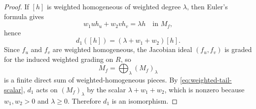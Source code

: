 \documentclass[10pt,a4paper]{amsart}
\renewcommand{\ge}{\geqslant}
\begin{document}
\begin{proof}
If $[h]$ is weighted homogeneous of weighted degree $\lambda$, then Euler's formula gives
\[
w_1uh_u+w_2vh_v=\lambda h
\quad\text{in }M_f,
\]
hence
\begin{equation}\label{eq:weighted-tail-scalar}
d_1([h])=(\lambda+w_1+w_2)[h].
\end{equation}
Since $f_u$ and $f_v$ are weighted homogeneous, the Jacobian ideal $(f_u,f_v)$ is graded for the induced weighted grading on $R$, so
\[
M_f=\bigoplus_{\lambda}(M_f)_\lambda
\]
is a finite direct sum of weighted-homogeneous pieces. By \eqref{eq:weighted-tail-scalar}, $d_1$ acts on $(M_f)_\lambda$ by the scalar \(\lambda+w_1+w_2\), which is nonzero because \(w_1,w_2>0\) and \(\lambda\ge 0\). Therefore $d_1$ is an isomorphism.
\end{proof}
\end{document}
